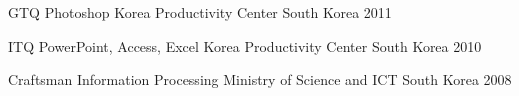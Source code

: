 

\begin{cvhonors}

  \cvhonor
    {GTQ Photoshop} %
    {Korea Productivity Center} %
    {South Korea} %
    {2011} %

  \cvhonor
    {ITQ PowerPoint, Access, Excel} %
    {Korea Productivity Center} %
    {South Korea} %
    {2010} %

  \cvhonor
    {Craftsman Information Processing} %
    {Ministry of Science and ICT} %
    {South Korea} %
    {2008} %

\end{cvhonors}

